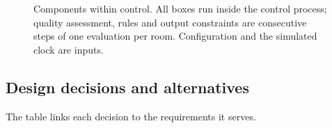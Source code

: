 \documentclass[11pt,a4paper]{article}
\begin{document}
\begin{figure}[H]
\caption{Components within control. All boxes run inside the control process; quality assessment, rules and output constraints are consecutive steps of one evaluation per room. Configuration and the simulated clock are inputs.}\label{fig:components}
\end{figure}

\subsection{Design decisions and alternatives}
The table links each decision to the requirements it serves.
\end{document}
